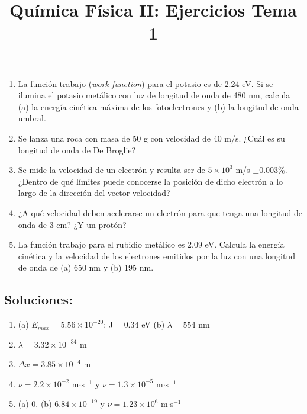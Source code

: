 \documentclass{tufte-handout}
\title[Química Física II: Ejercicios Tema 1]{
Química Física II: Ejercicios Tema 1}
\date{}  %
\begin{document}
\maketitle
\large
\begin{enumerate}
    \item La función trabajo (\textit{work
    function}) para el potasio es de 2.24
    eV. Si se ilumina el potasio metálico
    con luz de longitud de onda de 480 nm,
    calcula (a) la energía cinética máxima
    de los fotoelectrones y (b) la longitud
    de onda umbral.
    
    \item Se lanza una roca con masa de 
    50 g con velocidad de 40 m/s. ¿Cuál es
    su longitud de onda de De Broglie?
    
    \item Se mide la velocidad de un
    electrón y resulta ser de $5\times10^3$
    m/s $\pm$0.003\%. ¿Dentro de qué
    límites puede conocerse la posición de
    dicho electrón a lo largo de la
    dirección del vector velocidad?

   \item ¿A qué velocidad deben acelerarse un electrón
   para que tenga una longitud de onda de 3 cm? 
   ¿Y un protón?

   \item La función trabajo para el rubidio metálico 
   es 2,09 eV. Calcula la energía cinética y la 
   velocidad de los electrones emitidos por la luz
   con una longitud de onda de (a) 650 nm y (b) 195 nm.
\end{enumerate}

\newpage
\subsection{\textbf{Soluciones:}}
\begin{enumerate}
    \item (a) $E_{max}=5.56\times 10^{-20}$; J$=0.34$ eV
    (b) $\lambda=554$ nm
    \item $\lambda=3.32\times 10^{-34}$ m
    \item $\Delta x=3.85\times 10^{-4}$ m
    \item $\nu=2.2\times 10^{-2}$ m$\cdot$s$^{-1}$ y $\nu=1.3\times 10^{-5}$ m$\cdot$s$^{-1}$
    \item (a) $0$. (b) $6.84\times10^{-19}$ y $\nu=1.23\times 10^6$ m$\cdot$s$^{-1}$
\end{enumerate}
\end{document}
